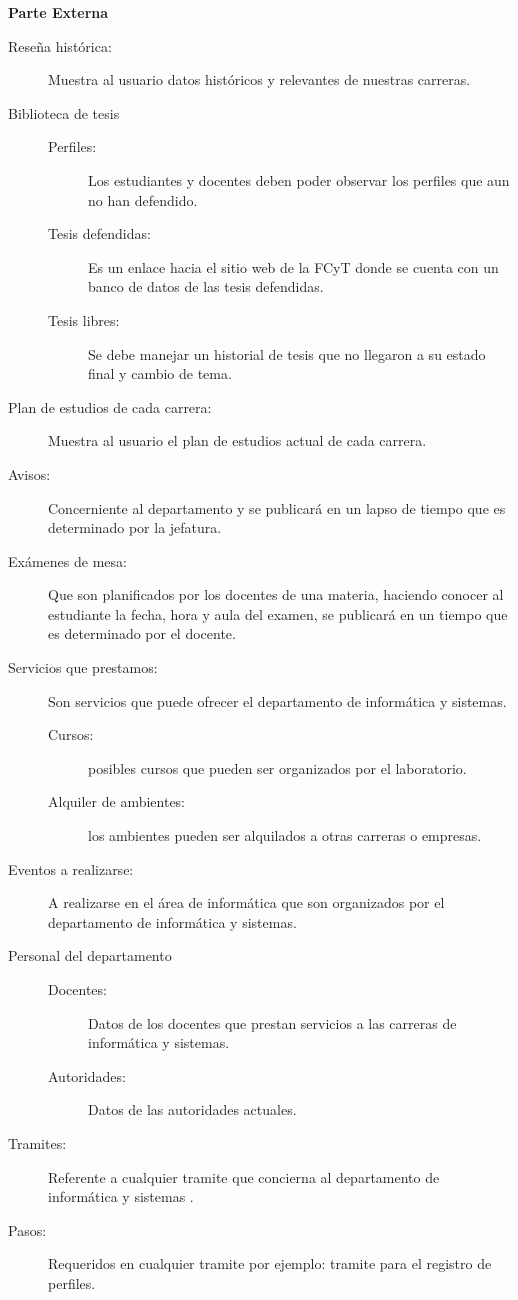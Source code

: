 \documentclass[10pt,letterpaper,twoside]{article}
\newcommand{\ctext}[1]{
    \vspace{5mm}
    {{\textcolor{titlecolor}{\large{\textbf{\textsf{#1}}}}}}
    \\
}
\begin{document}
\begin{multicols}{2}
\ctext{Parte Externa}
\begin{description}
\item [Reseña histórica:] Muestra al usuario datos históricos y relevantes de nuestras carreras.
\item [Biblioteca de tesis]
\begin{description}
    \item [Perfiles:] Los estudiantes y docentes deben poder observar los perfiles que aun no han defendido.
    \item [Tesis defendidas:] Es un enlace hacia el sitio web de la FCyT donde se cuenta con un banco de datos de las tesis defendidas.
    \item [Tesis libres:] Se debe manejar un historial de tesis que no llegaron a su estado final y cambio de tema.
\end{description}
\item [Plan de estudios de cada carrera:] Muestra al usuario el plan de estudios actual de cada carrera.
\item [Avisos:] Concerniente al departamento y se publicará en un lapso de tiempo que es determinado por la jefatura.
\item [Exámenes de mesa:] Que son planificados por los docentes de una materia, haciendo conocer al estudiante la fecha, hora y aula del examen, se publicará en un tiempo que es determinado por el docente.
\item [Servicios que prestamos:] Son servicios que puede ofrecer el departamento de informática y sistemas.
\begin{description}
    \item [Cursos:] posibles cursos que pueden ser organizados por el laboratorio.
    \item [Alquiler de ambientes:] los ambientes pueden ser alquilados a otras carreras o empresas.
\end{description}
\item [Eventos a realizarse:] A realizarse en el área de informática que son organizados por el departamento de informática y sistemas.
\item [Personal del departamento]
\begin{description}
\item [Docentes:] Datos de los docentes que prestan servicios a las carreras de informática y sistemas.
\item [Autoridades:] Datos de las autoridades actuales.
\end{description}
\item [Tramites:] Referente a cualquier tramite que concierna al departamento de informática y sistemas .
\item [Pasos:] Requeridos en cualquier tramite por ejemplo: tramite para el registro de perfiles.
\end{description}


\end{multicols}
\end{document}
